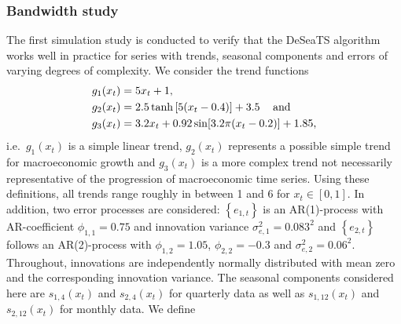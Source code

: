 \subsubsection{Bandwidth study}\label{sec:bandwidthstudy}

The first simulation study is conducted to verify that the DeSeaTS algorithm works well in practice for series with trends, seasonal components and errors of varying degrees of complexity. We consider the trend functions
\begin{align*}
&g_1(x_t)=5x_t + 1,\\
&g_2(x_t)=2.5\tanh\left[5(x_t - 0.4)\right] + 3.5\hspace{3mm}\text{ and}\\ &g_3(x_t) = 3.2 x_t + 0.92 \sin[3.2\pi (x_t - 0.2)]+1.85,
\end{align*}
i.e.~\(g_1(x_t)\) is a simple linear trend, \(g_2(x_t)\) represents a possible simple trend for macroeconomic growth and \(g_3(x_t)\) is a more complex trend not necessarily representative of the progression of macroeconomic time series. Using these definitions, all trends range roughly in between 1 and 6 for \(x_t\in[0,1]\). In addition, two error processes are considered: \(\left\{e_{1,t}\right\}\) is an AR(1)-process with AR-coefficient \(\phi_{1,1} = 0.75\) and innovation variance \(\sigma_{e,1}^2=0.083^2\) and \(\left\{e_{2,t}\right\}\) follows an AR(2)-process with \(\phi_{1,2} = 1.05\), \(\phi_{2,2} = -0.3\) and \(\sigma_{e,2}^2 = 0.06^2\). Throughout, innovations are independently normally distributed with mean zero and the corresponding innovation variance. The seasonal components considered here are \(s_{1,4}(x_t)\) and \(s_{2,4}(x_t)\) for quarterly data as well as \(s_{1,12}(x_t)\) and \(s_{2,12}(x_t)\) for monthly data. We define
